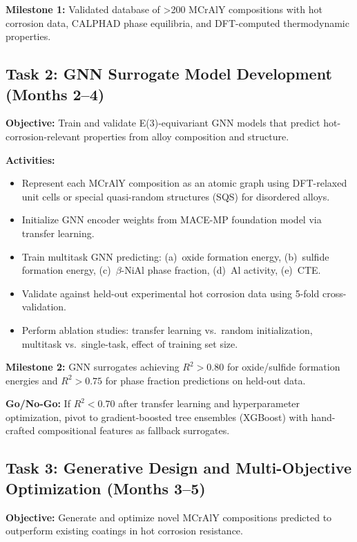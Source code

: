 \documentclass[11pt,letterpaper]{article}
\begin{document}
\textbf{Milestone 1:} Validated database of \textgreater200 MCrAlY compositions with hot corrosion data, CALPHAD phase equilibria, and DFT-computed thermodynamic properties.

\subsection{Task 2: GNN Surrogate Model Development (Months 2--4)}

\textbf{Objective:} Train and validate E(3)-equivariant GNN models that predict hot-corrosion-relevant properties from alloy composition and structure.

\textbf{Activities:}
\begin{itemize}[nosep]
  \item Represent each MCrAlY composition as an atomic graph using DFT-relaxed unit cells or special quasi-random structures (SQS) for disordered alloys.
  \item Initialize GNN encoder weights from MACE-MP foundation model via transfer learning.
  \item Train multitask GNN predicting: (a)~oxide formation energy, (b)~sulfide formation energy, (c)~$\beta$-NiAl phase fraction, (d)~Al activity, (e)~CTE.
  \item Validate against held-out experimental hot corrosion data using 5-fold cross-validation.
  \item Perform ablation studies: transfer learning vs.\ random initialization, multitask vs.\ single-task, effect of training set size.
\end{itemize}

\textbf{Milestone 2:} GNN surrogates achieving $R^2 > 0.80$ for oxide/sulfide formation energies and $R^2 > 0.75$ for phase fraction predictions on held-out data.

\textbf{Go/No-Go:} If $R^2 < 0.70$ after transfer learning and hyperparameter optimization, pivot to gradient-boosted tree ensembles (XGBoost) with hand-crafted compositional features as fallback surrogates.

\subsection{Task 3: Generative Design and Multi-Objective Optimization (Months 3--5)}

\textbf{Objective:} Generate and optimize novel MCrAlY compositions predicted to outperform existing coatings in hot corrosion resistance.
\end{document}
